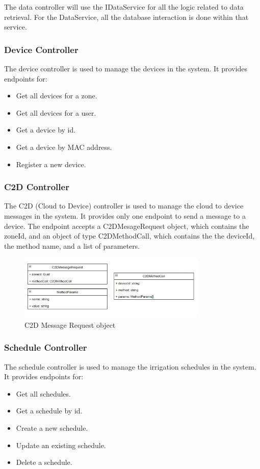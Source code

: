 The data controller will use the IDataService for all the logic related to data retrieval.
For the DataService, all the database interaction is done within that service.

\subsubsection{Device Controller}
The device controller is used to manage the devices in the system.
It provides endpoints for:
\begin{itemize}
    \item Get all devices for a zone.
    \item Get all devices for a user.
    \item Get a device by id.
    \item Get a device by MAC address.
    \item Register a new device.
\end{itemize}

\subsubsection{C2D Controller}
The C2D (Cloud to Device) controller is used to manage the cloud to device messages in the system.
It provides only one endpoint to send a message to a device. The endpoint accepts a C2DMesageRequest object, 
which contains the zoneId, and an object of type C2DMethodCall, which contains the the deviceId, the method name, and a list of parameters.
\begin{figure}[H]
    \centering
    \includegraphics[width=0.8\textwidth]{images/c2d-message-request.png}
    \caption{C2D Message Request object}
    \label{fig:c2d-request}
\end{figure}

\subsubsection{Schedule Controller}
The schedule controller is used to manage the irrigation schedules in the system.
It provides endpoints for:
\begin{itemize}
    \item Get all schedules.
    \item Get a schedule by id.
    \item Create a new schedule.
    \item Update an existing schedule.
    \item Delete a schedule.
\end{itemize}

